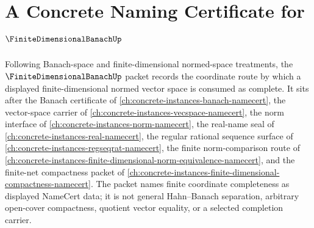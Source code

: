 \chapter{A Concrete Naming Certificate for $\FiniteDimensionalBanachUp$}
\label{ch:concrete-instances-finite-dimensional-banach-namecert}

Following Banach-space and finite-dimensional normed-space treatments, the $\FiniteDimensionalBanachUp$ packet records the coordinate route by which a displayed finite-dimensional normed vector space is consumed as complete. It sits after the Banach certificate of \autoref{ch:concrete-instances-banach-namecert}, the vector-space carrier of \autoref{ch:concrete-instances-vecspace-namecert}, the norm interface of \autoref{ch:concrete-instances-norm-namecert}, the real-name seal of \autoref{ch:concrete-instances-real-namecert}, the regular rational sequence surface of \autoref{ch:concrete-instances-regseqrat-namecert}, the finite norm-comparison route of \autoref{ch:concrete-instances-finite-dimensional-norm-equivalence-namecert}, and the finite-net compactness packet of \autoref{ch:concrete-instances-finite-dimensional-compactness-namecert}. The packet names finite coordinate completeness as displayed NameCert data; it is not general Hahn--Banach separation, arbitrary open-cover compactness, quotient vector equality, or a selected completion carrier.

